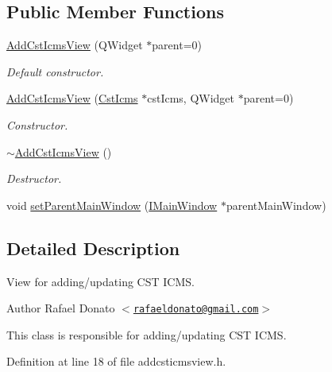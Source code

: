 \subsection*{\-Public \-Member \-Functions}
\begin{DoxyCompactItemize}
\item 
\hyperlink{class_add_cst_icms_view_a479952c621a61176bfb34ada9d34f396}{\-Add\-Cst\-Icms\-View} (\-Q\-Widget $\ast$parent=0)
\begin{DoxyCompactList}\small\item\em \-Default constructor. \end{DoxyCompactList}\item 
\hyperlink{class_add_cst_icms_view_ae370f0f7545454e235ab12e6e31575ca}{\-Add\-Cst\-Icms\-View} (\hyperlink{class_cst_icms}{\-Cst\-Icms} $\ast$cst\-Icms, \-Q\-Widget $\ast$parent=0)
\begin{DoxyCompactList}\small\item\em \-Constructor. \end{DoxyCompactList}\item 
\hyperlink{class_add_cst_icms_view_a2b89ec1052d345c52b6cd68df5c813c2}{$\sim$\-Add\-Cst\-Icms\-View} ()
\begin{DoxyCompactList}\small\item\em \-Destructor. \end{DoxyCompactList}\item 
void \hyperlink{class_add_cst_icms_view_a996943ac0606b6ed0f12cc0f58151399}{set\-Parent\-Main\-Window} (\hyperlink{class_i_main_window}{\-I\-Main\-Window} $\ast$parent\-Main\-Window)
\end{DoxyCompactItemize}


\subsection{\-Detailed \-Description}
\-View for adding/updating \-C\-S\-T \-I\-C\-M\-S. 

\begin{DoxyAuthor}{\-Author}
\-Rafael \-Donato $<$\href{mailto:rafaeldonato@gmail.com}{\tt rafaeldonato@gmail.\-com}$>$
\end{DoxyAuthor}
\-This class is responsible for adding/updating \-C\-S\-T \-I\-C\-M\-S. 

\-Definition at line 18 of file addcsticmsview.\-h.



